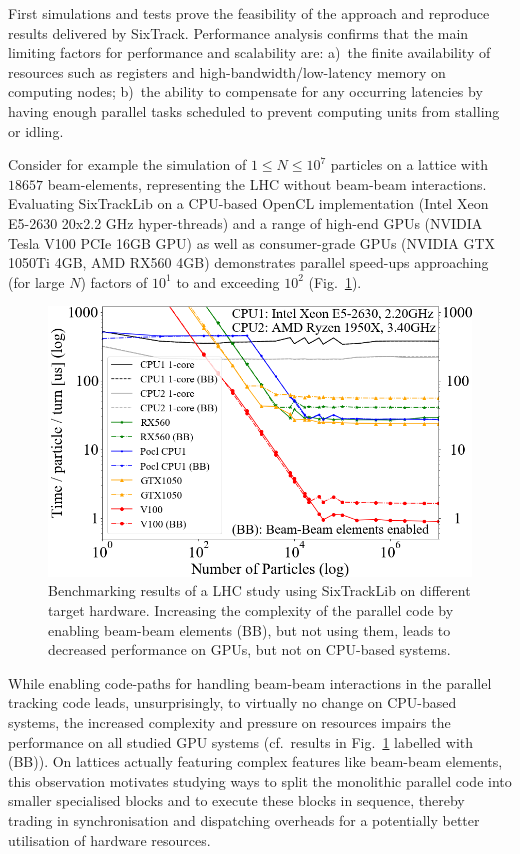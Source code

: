 \documentclass[a4paper,
              ]{jacow}
\begin{document}
First simulations and tests prove the feasibility of the approach and reproduce results delivered by SixTrack. Performance analysis confirms that the main limiting factors for performance and scalability are: a)~the finite availability of resources such as registers and high-bandwidth/low-latency memory on computing nodes; b)~the ability to compensate for any occurring latencies by having enough parallel tasks scheduled to prevent computing units from stalling or idling. 

Consider for example the simulation of $1 \leq N \leq 10^7$ particles on a lattice with $18657$ beam-elements, representing the LHC without beam-beam interactions. Evaluating SixTrackLib on a CPU-based OpenCL implementation (Intel Xeon E5-2630 20x2.2 GHz hyper-threads) and a range of high-end GPUs (NVIDIA Tesla V100 PCIe 16GB GPU) as well as consumer-grade GPUs (NVIDIA GTX 1050Ti 4GB, AMD RX560 4GB) demonstrates parallel speed-ups approaching (for large $N$) factors of $10^1$ to and exceeding $10^2$ (Fig.~\ref{fig:sixtracklib_results}). 
\begin{figure}[htb]
 \centering
 \includegraphics[width=\columnwidth]{devices_times_per_particle_and_turn.png}
 \caption{Benchmarking results of a LHC study using SixTrackLib on different target hardware. Increasing the complexity of the parallel code by enabling beam-beam elements (BB), but not using them, leads to decreased performance on GPUs, but not on CPU-based systems.}
 \label{fig:sixtracklib_results}
\end{figure}

While enabling code-paths for handling beam-beam interactions in the parallel tracking code leads, unsurprisingly, to virtually no change on CPU-based systems, the increased complexity and pressure on resources impairs the performance on all studied GPU systems (cf.\ results in Fig.~\ref{fig:sixtracklib_results} labelled with (BB)).
On lattices actually featuring complex features like beam-beam elements, this observation motivates studying ways to split the monolithic parallel code into smaller specialised blocks and to execute these blocks in sequence, thereby trading in synchronisation and dispatching overheads for a potentially better utilisation of hardware resources.
\end{document}
